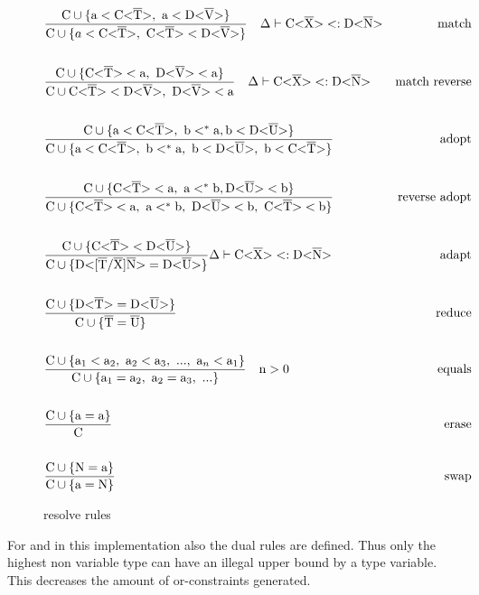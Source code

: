 \begin{figure}[H]
    \begin{align*}
        &\frac{\cand \{ \text{a} < \nvt{C}{T}, \ \text{a} < \nvt{D}{V} \} }{ \cand \{ a < \nvt{C}{T}, \ \nvt{C}{T} < \nvt{D}{V} \} } \quad \Delta \vdash \nvt{C}{X} <: \nvt{D}{N} &\text{match}\\
        \\
        &\frac{\cand \{ \nvt{C}{T} < \text{a}, \ \nvt{D}{V} < \text{a} \} }{ \cand \nvt{C}{T} < \nvt{D}{V}, \ \nvt{D}{V} < \text{a} } \quad \Delta \vdash \nvt{C}{X} <: \nvt{D}{N} &\text{match reverse}\\
        \\
        &\frac{\cand \{ \text{a} < \nvt{C}{T}, \ \text{b} <^* \text{a}, \text{b} < \nvt{D}{U}  \} }{ \cand \{ \text{a} < \nvt{C}{T}, \ \text{b} <^* \text{a}, \ \text{b} < \nvt{D}{U}, \ \text{b} < \nvt{C}{T} \} } &\text{adopt}\\
        \\
        &\frac{\cand \{ \nvt{C}{T} < \text{a}, \ \text{a} <^* \text{b}, \nvt{D}{U} < \text{b} \} }{ \cand \{\nvt{C}{T} < \text{a}, \ \text{a} <^* \text{b}, \ \nvt{D}{U} < \text{b}, \ \nvt{C}{T} < \text{b} \} } &\text{reverse adopt}\\
        \\
        &\frac{\cand \{ \nvt{C}{T} < \nvt{D}{U} \} }{ \cand \{ \text{D<} \tsxsns{T}{X}{N} \text{>} = \nvt{D}{U} \} } \Delta \vdash \nvt{C}{X} <: \nvt{D}{N} &\text{adapt} \\
        \\
        &\frac{\cand \{ \nvt{D}{T} = \nvt{D}{U} \} }{\cand \{ \ot{T} = \ot{U} \} } &\text{reduce} \\
        \\
        &\frac{\cand \{ \text{a}_1 < \text{a}_2, \ \text{a}_2 < \text{a}_3, \ ..., \ \text{a}_n < \text{a}_1 \} }{\cand \{ \text{a}_1 = \text{a}_2, \ \text{a}_2 = \text{a}_3, \ ... \} } \quad \text{n} > 0 &\text{equals} \\
        \\
        &\frac{\cand \{ \text{a} = \text{a} \} }{\text{C}} &\text{erase} \\
        \\
        &\frac{\cand \{ \text{N} = \text{a} \} }{\cand \{ \text{a} = \text{N} \} } &\text{swap}
    \end{align*}
    \caption{resolve rules}
    \label{resolve_rules}
\end{figure}

For  and  in this implementation also the dual rules are defined.
Thus only the highest non variable type can have an illegal upper bound by a type variable.
This decreases the amount of or-constraints generated.

